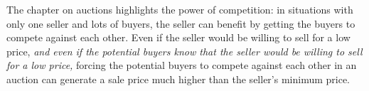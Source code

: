 \begin{comment}
\clearpage
\begin{quote}
\hspace*{3cm}\large{\textbf{Mr.\ Smeds and Mr.\ Spats}}\\[.2cm]
\hspace*{3cm}Mr.\ Spats\\[.03cm]
\hspace*{3cm}Had twenty-one hats,\\[.03cm]
\hspace*{3cm}And none of them were the same. \\[.03cm]
\hspace*{3cm}And Mr.\ Smeds\\[.03cm]
\hspace*{3cm}Had twenty-one heads \\[.03cm]
\hspace*{3cm}And only one hat to his name.\\[.1cm]
\hspace*{3cm}Now, when Mr.\ Smeds\\[.03cm]
\hspace*{3cm}Met Mr.\ Spats,\\[.03cm]
\hspace*{3cm}They talked of the\\[.03cm]
\hspace*{3cm}Buying and selling of hats.\\[.03cm]
\hspace*{3cm}And Mr.\ Spats\\[.03cm]
\hspace*{3cm}Bought \emph{Mr.\ Smeds'} hat!\\[.03cm]
\hspace*{3cm}Did you ever hear anything\\[.03cm]
\hspace*{3cm}Crazier than that?\\[.2cm]
\hspace*{3cm}-- Shel Silverstein,\\[.03cm]
\hspace*{3cm}\emph{A Light in the Attic} (1981)
\end{quote}
\end{comment}
\vspace*{.4cm}

The chapter on auctions highlights the power of competition: in situations with only one seller and lots of buyers, the seller can benefit by getting the buyers to compete against each other. Even if the seller would be willing to sell for a low price, \emph{and even if the potential buyers know that the seller would be willing to sell for a low price,} forcing the potential buyers to compete against each other in an auction can generate a sale price much higher than the seller's minimum price.

